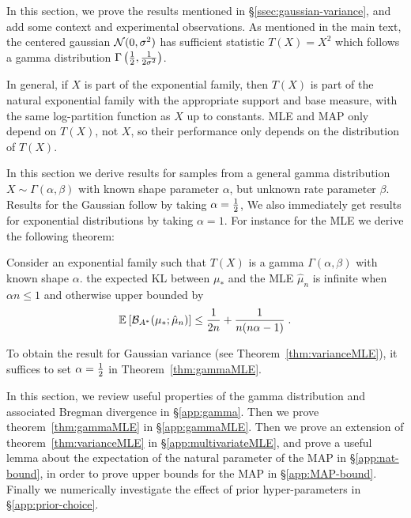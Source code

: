 In this section, we prove the results mentioned in \S\ref{ssec:gaussian-variance},
and add some context and experimental observations.
As mentioned in the main text, the centered gaussian ${\mathcal N}(0,\sigma^2)$ has sufficient statistic $T(X)=X^2$ which follows a gamma distribution $\Gamma\left(\frac{1}{2}, \frac{1}{2 \sigma^2}\right)$. 

In general, if $X$ is part of the exponential family, then $T(X)$ is part of the natural exponential family with the appropriate support and base measure, with the same log-partition function as $X$ up to constants.
MLE and MAP only depend on $T(X)$, not $X$, so their performance only depends on the distribution of $T(X)$.
 
In this section we derive results for samples  from a general gamma distribution $X \sim \Gamma(\alpha,\beta)$ with known shape parameter $\alpha$, but unknown rate parameter $\beta$.
Results for the Gaussian follow by taking $\alpha=\frac{1}{2}$,
We also immediately get results for exponential distributions by taking $\alpha=1$.
For instance for the MLE we derive the following theorem:

\begin{theorem}
	\label{thm:gammaMLE}
	Consider an exponential family such that $T(X)$ is a gamma $\Gamma(\alpha, \beta)$ with known shape $\alpha$.
	the expected KL between $\mu_*$ and the MLE $\hat\mu_n$	is infinite when $\alpha n\leq 1$ and otherwise upper bounded by
	\begin{align}
		 \mathbb{E}_{} \left[ {\mathcal B}_{A^*}( \mu_*; \hat \mu_n)  \right] 
			\leq \frac{1}{2n} + \frac{1}{n(n \alpha-1)}  \; .
	\end{align}
\end{theorem}
	
To obtain the result for Gaussian variance (see Theorem~\ref{thm:varianceMLE}), it suffices to set $\alpha=\frac{1}{2}$ in Theorem~\ref{thm:gammaMLE}.

In this section, we review useful properties of the gamma distribution and associated Bregman divergence in \S\ref{app:gamma}. 
Then we prove theorem~\ref{thm:gammaMLE} in \S\ref{app:gammaMLE}.
Then we prove an extension of theorem~\ref{thm:varianceMLE} in \S\ref{app:multivariateMLE}, and prove a useful lemma about the expectation of the natural parameter of the MAP in \S\ref{app:nat-bound}, in order to prove upper bounds for the MAP in \S\ref{app:MAP-bound}.
Finally we numerically investigate the effect of prior hyper-parameters in \S\ref{app:prior-choice}.

